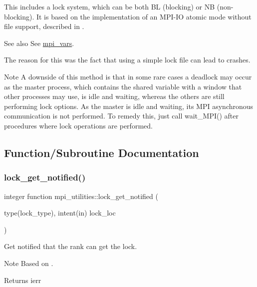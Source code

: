 This includes a lock system, which can be both BL (blocking) or NB (non-\/blocking). It is based on the implementation of an M\+P\+I-\/\+IO atomic mode without file support, described in \cite{RossAtomicIO}.

\begin{DoxySeeAlso}{See also}
See \hyperlink{namespacempi__vars}{mpi\+\_\+vars}.
\end{DoxySeeAlso}
The reason for this was the fact that using a simple lock file can lead to crashes.

\begin{DoxyNote}{Note}
A downside of this method is that in some rare cases a deadlock may occur as the master process, which contains the shared variable with a window that other processes may use, is idle and waiting, whereas the others are still performing lock options. As the master is idle and waiting, its M\+PI asynchronous communication is not performed. To remedy this, just call wait\+\_\+\+M\+P\+I() after procedures where lock operations are performed. 
\end{DoxyNote}


\subsection{Function/\+Subroutine Documentation}
\mbox{\label{namespacempi__utilities_a17c39b0498528e2532c8347b0b7dec86}} 
\subsubsection{\texorpdfstring{lock\+\_\+get\+\_\+notified()}{lock\_get\_notified()}}
{\footnotesize\ttfamily integer function mpi\+\_\+utilities\+::lock\+\_\+get\+\_\+notified (\begin{DoxyParamCaption}\item[{type(lock\+\_\+type), intent(in)}]{lock\+\_\+loc }\end{DoxyParamCaption})}



Get notified that the rank can get the lock. 

\begin{DoxyNote}{Note}
Based on \cite{RossAtomicIO}.
\end{DoxyNote}
\begin{DoxyReturn}{Returns}
ierr
\end{DoxyReturn}

